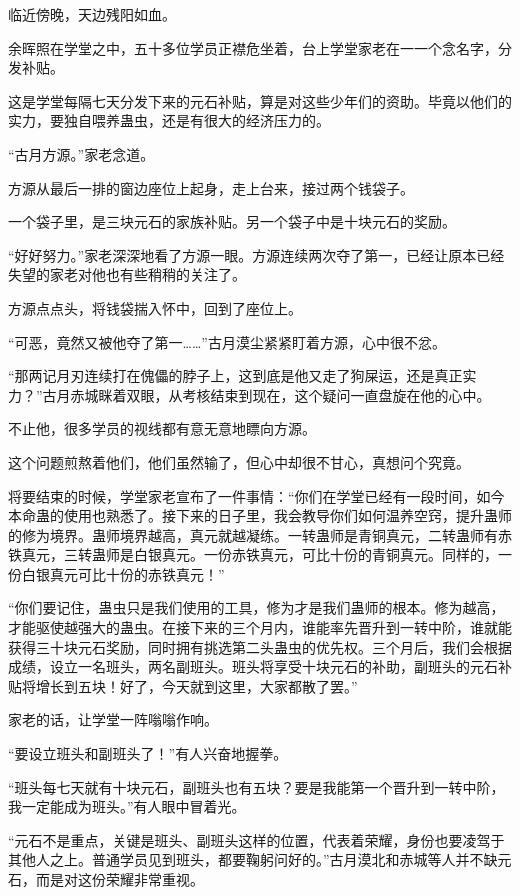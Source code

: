 
\begin{this_body}

临近傍晚，天边残阳如血。

余晖照在学堂之中，五十多位学员正襟危坐着，台上学堂家老在一一个念名字，分发补贴。

这是学堂每隔七天分发下来的元石补贴，算是对这些少年们的资助。毕竟以他们的实力，要独自喂养蛊虫，还是有很大的经济压力的。

“古月方源。”家老念道。

方源从最后一排的窗边座位上起身，走上台来，接过两个钱袋子。

一个袋子里，是三块元石的家族补贴。另一个袋子中是十块元石的奖励。

“好好努力。”家老深深地看了方源一眼。方源连续两次夺了第一，已经让原本已经失望的家老对他也有些稍稍的关注了。

方源点点头，将钱袋揣入怀中，回到了座位上。

“可恶，竟然又被他夺了第一……”古月漠尘紧紧盯着方源，心中很不忿。

“那两记月刃连续打在傀儡的脖子上，这到底是他又走了狗屎运，还是真正实力？”古月赤城眯着双眼，从考核结束到现在，这个疑问一直盘旋在他的心中。

不止他，很多学员的视线都有意无意地瞟向方源。

这个问题煎熬着他们，他们虽然输了，但心中却很不甘心，真想问个究竟。

将要结束的时候，学堂家老宣布了一件事情：“你们在学堂已经有一段时间，如今本命蛊的使用也熟悉了。接下来的日子里，我会教导你们如何温养空窍，提升蛊师的修为境界。蛊师境界越高，真元就越凝练。一转蛊师是青铜真元，二转蛊师有赤铁真元，三转蛊师是白银真元。一份赤铁真元，可比十份的青铜真元。同样的，一份白银真元可比十份的赤铁真元！”

“你们要记住，蛊虫只是我们使用的工具，修为才是我们蛊师的根本。修为越高，才能驱使越强大的蛊虫。在接下来的三个月内，谁能率先晋升到一转中阶，谁就能获得三十块元石奖励，同时拥有挑选第二头蛊虫的优先权。三个月后，我们会根据成绩，设立一名班头，两名副班头。班头将享受十块元石的补助，副班头的元石补贴将增长到五块！好了，今天就到这里，大家都散了罢。”

家老的话，让学堂一阵嗡嗡作响。

“要设立班头和副班头了！”有人兴奋地握拳。

“班头每七天就有十块元石，副班头也有五块？要是我能第一个晋升到一转中阶，我一定能成为班头。”有人眼中冒着光。

“元石不是重点，关键是班头、副班头这样的位置，代表着荣耀，身份也要凌驾于其他人之上。普通学员见到班头，都要鞠躬问好的。”古月漠北和赤城等人并不缺元石，而是对这份荣耀非常重视。


\end{this_body}
